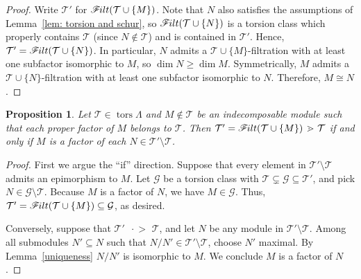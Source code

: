 \documentclass[10pt]{amsart}
\providecommand{\1}{}
\DeclareMathOperator{\tors}{tors}
\newcommand{\calG}{\mathcal{G}}
\newcommand{\calT}{\mathcal{T}}
\newcommand{\filt}{\mathscr{F}\Mk ilt}
\newcommand{\covers}{{\,\,\,\cdot\!\!\!\! >\,\,}}
\renewcommand{\1}{\hat{1}}
\newcommand{\0}{\hat{0}}
\newcommand*{\Mk}{\mkern -2mu}
\newtheorem{proposition}[theorem]{Proposition}
\theoremstyle{definition}
\begin{document}
\begin{proof}
Write $\calT'$ for $\filt(\calT \cup \{M\})$.
Note that $N$ also satisfies the assumptions of Lemma~\ref{lem:
 torsion and schur}, so $\filt(\calT \cup \{N\})$ is a torsion class
which properly contains $\calT$ (since $N\notin \calT$) and is
contained in $\calT'$.
Hence, $\calT'=\filt(\calT \cup \{N\})$. 
In particular, $N$ admits a $\calT \cup \{M\}$-filtration with at
least one subfactor isomorphic to $M$, so $\dim N \geq \dim M$. 
Symmetrically, $M$ admits a $\calT \cup \{N\}$-filtration with at
least one subfactor isomorphic to $N$.
Therefore, $M\cong N$. 
\end{proof}

\begin{proposition}\label{prop: epis and covers}
Let $\calT\in \tors\Lambda$ and $M\not\in \calT$ be an indecomposable module such that each proper factor of $M$ belongs to $\calT$.
Then $\calT' =\filt(\calT \cup \{M\}) \covers \calT$ if and only if $M$ is a factor of each $N\in \calT'\setminus \calT$.
\end{proposition}
\begin{proof}
First we argue the ``if'' direction.
Suppose that every element in $\calT'\setminus \calT$ admits an epimorphism to $M$.
Let $\calG$ be a torsion class with $\calT \subsetneq \calG \subseteq \calT'$, and pick $N\in \calG\setminus \calT$.
Because $M$ is a factor of $N$, we have $M\in \calG$.
Thus, $\calT'=\filt(\calT \cup \{M\}) \subseteq \calG$, as desired.

Conversely, suppose that $\calT'\covers \calT$, and let $N$ be any module in $\calT'\setminus \calT$.
Among all submodules $N'\subseteq N$ such that $N/N'\in \calT'\setminus \calT$, choose $N'$ maximal.
By Lemma~\ref{uniqueness} $N/N'$ is isomorphic to $M$.
We conclude $M$ is a factor of $N$.
\end{proof}
\end{document}
